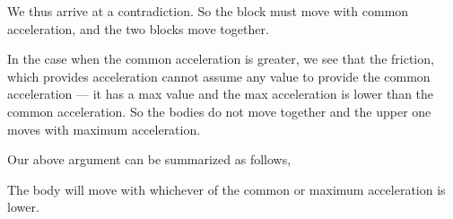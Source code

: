 We thus arrive at a contradiction. So the block must move with common acceleration, and 
the two blocks move together.

In the case when the common acceleration is greater, we see that the friction, which provides 
acceleration cannot assume any value to provide the common acceleration --- it has a max value 
and the max acceleration is lower than the common acceleration. So the bodies do not move together 
and the upper one moves with maximum acceleration.

Our above argument can be summarized as follows,

\begin{mdframed}
    The body will move with whichever of the common or maximum acceleration is lower.
\end{mdframed}


